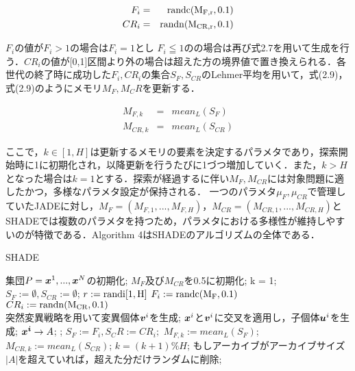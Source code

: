 \documentclass[a4paper,11pt,oneside,openany]{jsbook}
\def\vector#1{\mbox{\boldmath $#1$}}
\begin{document}
\begin{eqnarray}
  F_i & = & \rm{randc}(M_{F,r}, 0.1) \\
  CR_i & = & \rm{randn}(M_{CR,r}, 0.1)
\end{eqnarray}

$F_i$の値が$F_i>1$の場合は$F_i = 1$とし $F_i\leqq1の$の場合は再び式2.7を用いて生成を行う．$CR_i$の値が[0,1]区間より外の場合は超えた方の境界値で置き換えられる．各世代の終了時に成功した$F_i,CR_i$の集合$S_F,S_{CR}$のLehmer平均を用いて，式(2.9)，式(2.9)のようにメモリ$M_F,M_CR$を更新する．

\begin{eqnarray}
  M_{F,k} & = & mean_L(S_F)\\
  M_{CR,k} & = & mean_L(S_{CR})
\end{eqnarray}

ここで，$k \in [1,H]$は更新するメモリの要素を決定するパラメタであり，探索開始時に1に初期化され，以降更新を行うたびに1づつ増加していく．また，$k > H$となった場合は$k = 1$とする．探索が経過するに伴い$M_F,M_{CR}$には対象問題に適したかつ，多様なパラメタ設定が保持される．
一つのパラメタ$\mu _F, \mu _{CR}$で管理していたJADEに対し，$M_F = (M_{F,1},...,M_{F,H})$，$M_{CR}= (M_{CR,1},...,M_{CR,H})$とSHADEでは複数のパラメタを持つため，パラメタにおける多様性が維持しやすいのが特徴である．Algorithm 4はSHADEのアルゴリズムの全体である．

\newpage
\begin{algorithm}
\caption{SHADE}
\label{alg:pbnf}
\begin{algorithmic}
\STATE 集団$P={\vector{x}^1,...,\vector{x}^N}$の初期化;
\STATE $M _F$及び$M _{CR}$を0.5に初期化;
\STATE k = 1;
    \STATE $S_F := \emptyset, S_{CR} := \emptyset$;
        \STATE $r := \rm{randi}[1,H]$
        \STATE $F_i := \rm{randc}(M_F, 0.1)$ \\
        \STATE $CR_i := \rm{randn}(M_{CR}, 0.1)$ \\
        \STATE 突然変異戦略を用いて変異個体{$\vector{v}^i$}を生成;
        \STATE $\vector{x}^i$と$\vector{v}^i$に交叉を適用し，子個体$\vector{u}^i$を生成;
     \ENDFOR
        \IF {$f(\vector{u}^i) \leqq f(\vector{x}^i)$}
            \STATE $\vector{x^i} \rightarrow {A}$;
            \STATE {$\vector{x}^i := \vector{u}^i$};
            \STATE $S_F := {F_i}, S_CR := {CR_i};$
        \ENDIF
    \ENDFOR
        \STATE $M_{F,k}  :=  mean_L(S_F)$;
        \STATE $M_{CR,k}  :=  mean_L(S_{CR})$;
        \STATE $k = (k+1) \% H$;
    \ENDIF
    \STATE もしアーカイブがアーカイブサイズ$|A|$を超えていれば，超えた分だけランダムに削除;
\ENDWHILE
\end{algorithmic}
\end{algorithm}
\newpage
\end{document}

